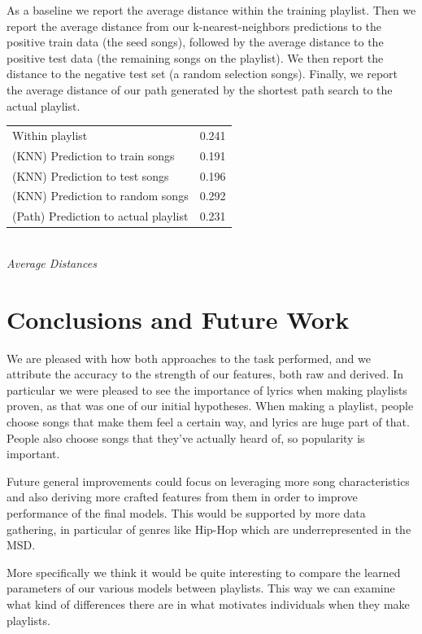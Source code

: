 \documentclass[acmtog]{acmart}
\begin{document}
As a baseline we report the average distance within the training playlist. Then we report the average distance from our k-nearest-neighbors predictions to the positive train data (the seed songs), followed by the average distance to the positive test data (the remaining songs on the playlist). We then report the distance to the negative test set (a random selection songs). Finally, we report the average distance of our path generated by the shortest path search to the actual playlist. \\

\begin{center}
\begin{tabular}{ll}
  \toprule
  Within playlist                      & 0.241 \\
  (KNN) Prediction to train songs      & 0.191 \\
  (KNN) Prediction to test songs       & 0.196 \\
  (KNN) Prediction to random songs     & 0.292 \\
  (Path) Prediction to actual playlist & 0.231 \\
  \bottomrule
\end{tabular}
\\
\footnotesize
  \emph{Average Distances}
\end{center}


\section{Conclusions and Future Work}

We are pleased with how both approaches to the task performed, and we attribute the accuracy to the strength of our features, both raw and derived. In particular we were pleased to see the importance of lyrics when making playlists proven, as that was one of our initial hypotheses. When making a playlist, people choose songs that make them feel a certain way, and lyrics are huge part of that. People also choose songs that they’ve actually heard of, so popularity is important.

Future general improvements could focus on leveraging more song characteristics and also deriving more crafted features from them in order to improve performance of the final models. This would be supported by more data gathering, in particular of genres like Hip-Hop which are underrepresented in the MSD.

More specifically we think it would be quite interesting to compare the learned parameters of our various models between playlists. This way we can examine what kind of differences there are in what motivates individuals when they make playlists.
\end{document}
